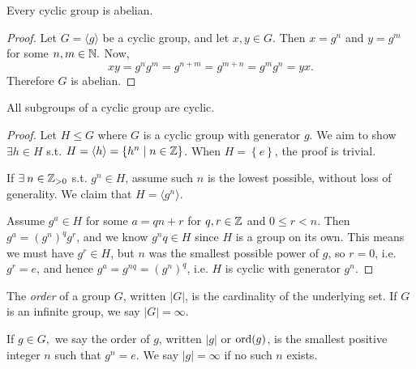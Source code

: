 \begin{theorem}
  Every cyclic group is abelian.
\end{theorem}
\begin{proof}
Let $G=\langle g\rangle$ be a cyclic group, and let $x,y \in G.$ Then $x=g^n$ and $y=g^m$ for some $n,m \in \mathbb N.$ Now, 
  $$xy=g^n g^m = g^{n+m} = g^{m+n} = g^m g^n=yx.$$ Therefore $G$ is abelian.
\end{proof}

\begin{theorem}
  All subgroups of a cyclic group are cyclic.
\end{theorem}
\begin{proof}
  Let $H\leq G$ where $G$ is a cyclic group with generator $g$. We aim to show $\exists h\in H$ s.t. $H=\langle h\rangle = \left\{
  h^n \mid n\in\mathbb Z  \right\}$. When $H=\left\{ e \right\}$, the proof is trivial. 
  
  
  If $\exists \: n\in\mathbb Z_{>0}$ s.t. $g^n\in H$, assume such $n$ is the lowest possible, without loss of generality. We claim that $H = \langle g^n \rangle.$ 
  
  Assume $g^a\in H$ for some $a=qn+r$ for $q,r\in \mathbb Z$ and $0\leq r < n$. Then $g^a=(g^n)^q g^r$, and we know $g^nq\in H$ since $H$ is a group on its own. This means we must have $g^r\in H$, but $n$ was the smallest
  possible power of $g$, so $r=0$, i.e. $g^r=e$, and hence $g^a = g^{nq} = (g^n)^q$, i.e. $H$ is
  cyclic with generator $g^n$.
\end{proof}



\begin{definition}
    The \emph{order} of a group $G$, written $|G|$, is the cardinality of the underlying set. If $G$ is an infinite group, we say $|G| = \infty$.

    If $g \in G,$ we say the order of $g$, written $|g|$ or $\operatorname{ord}(g)$, is the smallest positive integer $n$ such that $g^n = e$. We say $|g| = \infty$ if no such $n$ exists.

    \label{orderGroup}
\end{definition}

